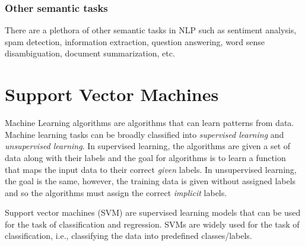 \subsubsection{Other semantic tasks}

There are a plethora of other semantic tasks in NLP such as sentiment analysis, spam detection, information extraction, question answering, word sense disambiguation, document summarization, etc.

\section{Support Vector Machines}\label{sec:SVM}

Machine Learning algorithms are algorithms that can learn patterns from data. Machine learning tasks can be broadly classified into \textit{supervised learning} and \textit{unsupervised learning}. In supervised learning, the algorithms are given a set of data along with their labels and the goal for algorithms is to learn a function that maps the input data to their correct \textit{given} labels. In unsupervised learning, the goal is the same, however, the training data is given without assigned labels and so the algorithms must assign the correct \emph{implicit} labels.

Support vector machines (SVM) are supervised learning models that can be used for the task of classification and regression. SVMs are widely used for the task of classification, i.e., classifying the data into predefined classes/labels.

